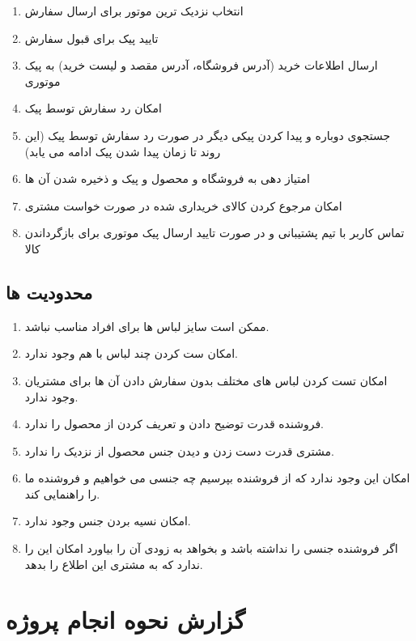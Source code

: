 \documentclass[12pt,a4paper]{article}
\begin{document}
\begin{enumerate}
\item
انتخاب نزدیک ترین موتور برای ارسال سفارش
\item
تایید پیک برای قبول سفارش
\item
ارسال اطلاعات خرید (آدرس فروشگاه، آدرس مقصد و لیست خرید) به پیک موتوری
\item
	امکان رد سفارش توسط پیک
\item
جستجوی دوباره و پیدا کردن پیکی دیگر در صورت رد سفارش توسط پیک (این روند تا زمان پیدا شدن پیک ادامه می یابد)
\item
امتیاز دهی به فروشگاه و محصول و پیک و ذخیره شدن آن ها
\item
امکان مرجوع کردن کالای خریداری شده در صورت خواست مشتری
\item
تماس کاربر با تیم پشتیبانی و در صورت تایید ارسال پیک موتوری برای بازگرداندن کالا
	
\end{enumerate}

\subsection{\textbf{	محدودیت ها }} \label{section.RC.constraints}

\begin{enumerate}
	

\item
ممکن است سایز لباس ها برای افراد مناسب نباشد.
\item
امکان ست کردن چند لباس با هم وجود ندارد.
\item
امکان تست کردن لباس های مختلف بدون سفارش دادن آن ها برای مشتریان وجود ندارد.
\item
فروشنده قدرت توضیح دادن و تعریف کردن از محصول را ندارد.
\item
مشتری قدرت دست زدن و دیدن جنس محصول از نزدیک را ندارد.
\item
امکان این وجود ندارد که از فروشنده بپرسیم چه جنسی می خواهیم و فروشنده ما را راهنمایی کند.
\item
امکان نسیه بردن جنس وجود ندارد.
\item
اگر فروشنده جنسی را نداشته باشد و بخواهد به زودی آن را بیاورد امکان این را ندارد که به مشتری این اطلاع را بدهد.
	
\end{enumerate}	
\pagebreak

\section{\textbf{گزارش نحوه انجام پروژه}} \label{section.report}
\end{document}
